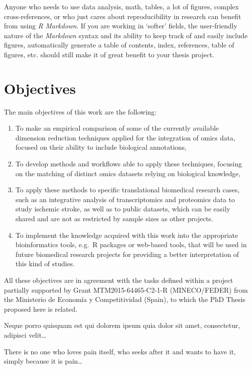\documentclass[a4paper, nobind]{templates/ociamthesis}
\renewcommand{\chaptermark}[1]{\markboth{\thechapter. #1}{\thechapter. #1}}
\begin{document}
Anyone who needs to use data analysis, math, tables, a lot of figures, complex cross-references, or who just cares about reproducibility in research can benefit from using \emph{R Markdown}.
If you are working in `softer' fields, the user-friendly nature of the \emph{Markdown} syntax and its ability to keep track of and easily include figures, automatically generate a table of contents, index, references, table of figures, etc. should still make it of great benefit to your thesis project.

\hypertarget{objectives}{%
\chapter{Objectives}\label{objectives}}

\chaptermark{Objectives}

\minitoc 

\noindent The main objectives of this work are the following:

\begin{enumerate}
\def\labelenumi{\arabic{enumi}.}
\item
  To make an empirical comparison of some of the currently available dimension reduction techniques applied for the integration of omics data, focused on their ability to include biological annotations,
\item
  To develop methods and workflows able to apply these techniques, focusing on the matching of distinct omics datasets relying on biological knowledge,
\item
  To apply these methods to specific translational biomedical research cases, such as an integrative analysis of transcriptomics and proteomics data to study ischemic stroke, as well as to public datasets, which can be easily shared and are not as restricted by sample sizes as other projects.
\item
  To implement the knowledge acquired with this work into the appropriate bioinformatics tools, e.g.~R packages or web-based tools, that will be used in future biomedical research projects for providing a better interpretation of this kind of studies.
\end{enumerate}

All these objectives are in agreement with the tasks defined within a project partially supported by Grant MTM2015-64465-C2-1-R (MINECO/FEDER) from the Ministerio de Economía y Competitividad (Spain), to which the PhD Thesis proposed here is related.

\begin{savequote}
Neque porro quisquam est qui dolorem ipsum quia dolor sit amet,
consectetur, adipisci velit\ldots{}

There is no one who loves pain itself, who seeks after it and wants to
have it, simply because it is pain\ldots{}
\end{savequote}
\end{document}
